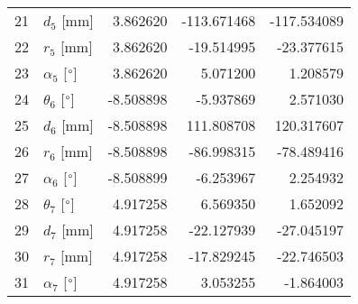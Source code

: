 \documentclass{standalone}%
\begin{document}
\begin{tabular}{llrrr}
21 &              $d_{5}$ [mm] &  3.862620 & -113.671468 & -117.534089 \\
22 &              $r_{5}$ [mm] &  3.862620 &  -19.514995 &  -23.377615 \\
23 &  $\alpha_{5}$ [$\degree$] &  3.862620 &    5.071200 &    1.208579 \\
24 &  $\theta_{6}$ [$\degree$] & -8.508898 &   -5.937869 &    2.571030 \\
25 &              $d_{6}$ [mm] & -8.508898 &  111.808708 &  120.317607 \\
26 &              $r_{6}$ [mm] & -8.508898 &  -86.998315 &  -78.489416 \\
27 &  $\alpha_{6}$ [$\degree$] & -8.508899 &   -6.253967 &    2.254932 \\
28 &  $\theta_{7}$ [$\degree$] &  4.917258 &    6.569350 &    1.652092 \\
29 &              $d_{7}$ [mm] &  4.917258 &  -22.127939 &  -27.045197 \\
30 &              $r_{7}$ [mm] &  4.917258 &  -17.829245 &  -22.746503 \\
31 &  $\alpha_{7}$ [$\degree$] &  4.917258 &    3.053255 &   -1.864003 \\
\bottomrule
\end{tabular}
%
\end{document}
